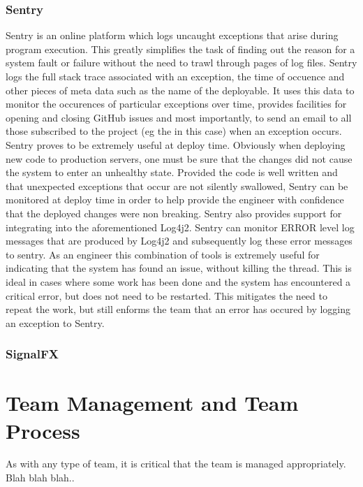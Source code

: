\subsection{Sentry\cite{sentry}}
Sentry is an online platform which logs uncaught exceptions that arise during program execution. This greatly simplifies the task of finding out the reason for a system fault or failure without the need to trawl through pages of log files. Sentry logs the full stack trace associated with an exception, the time of occuence and other pieces of meta data such as the name of the deployable. It uses this data to monitor the occurences of particular exceptions over time, provides facilities for opening and closing GitHub issues and most importantly, to send an email to all those subscribed to the project (eg the \team{} in this case) when an exception occurs. Sentry proves to be extremely useful at deploy time. Obviously when deploying new code to production servers, one must be sure that the changes did not cause the system to enter an unhealthy state. Provided the code is well written and that unexpected exceptions that occur are not silently swallowed, Sentry can be monitored at deploy time in order to help provide the engineer with confidence that the deployed changes were non breaking. Sentry also provides support for integrating into the aforementioned Log4j2. Sentry can monitor ERROR level log messages that are produced by Log4j2 and subsequently log these error messages to sentry. As an engineer this combination of tools is extremely useful for indicating that the system has found an issue, without killing the thread. This is ideal in cases where some work has been done and the system has encountered a critical error, but does not need to be restarted. This mitigates the need to repeat the work, but still enforms the team that an error has occured by logging an exception to Sentry.

\subsection{SignalFX\cite{sigfx}}





\chapter{Team Management and Team Process}
As with any type of team, it is critical that the team is managed appropriately. Blah blah blah.. 

